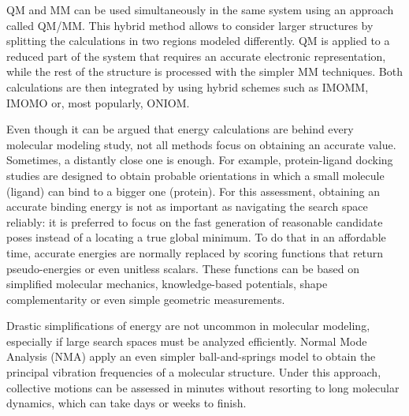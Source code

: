 QM and MM can be used simultaneously in the same system using an approach called QM/MM. This hybrid method allows to consider larger structures by splitting the calculations in two regions modeled differently. QM is applied to a reduced part of the system that requires an accurate electronic representation, while the rest of the structure is processed with the simpler MM techniques. Both calculations are then integrated by using hybrid schemes such as IMOMM,\cite{maseras1995imomm} IMOMO\cite{humbel1996imomo} or, most popularly, ONIOM.\cite{svensson1996oniom}

Even though it can be argued that energy calculations are behind every molecular modeling study, not all methods focus on obtaining an accurate value. Sometimes, a distantly close one is enough. For example, protein-ligand docking studies are designed to obtain probable orientations in which a small molecule (ligand) can bind to a bigger one (protein). For this assessment, obtaining an accurate binding energy is not as important as navigating the search space reliably: it is preferred to focus on the fast generation of reasonable candidate poses instead of a locating a true global minimum. To do that in an affordable time, accurate energies are normally replaced by scoring functions that return pseudo-energies or even unitless scalars. These functions can be based on simplified molecular mechanics, knowledge-based potentials, shape complementarity or even simple geometric measurements.

Drastic simplifications of energy are not uncommon in molecular modeling, especially if large search spaces must be analyzed efficiently. Normal Mode Analysis (NMA) apply an even simpler ball-and-springs model to obtain the principal vibration frequencies of a molecular structure. Under this approach, collective motions can be assessed in minutes without resorting to long molecular dynamics, which can take days or weeks to finish.



